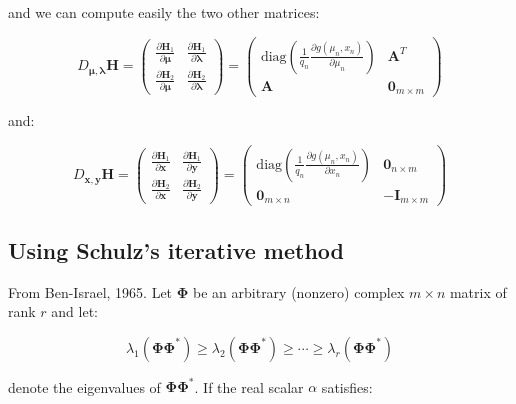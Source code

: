 \documentclass{tex/note}
\begin{document}
and we can compute easily the two other matrices:

\begin{equation*}
D_{\bm{\mu} , \bm{\lambda}} \bm{H} = \begin{pmatrix} \frac{\partial \bm{H}_1}{\partial \bm{\mu}} & \frac{\partial \bm{H}_1}{\partial \bm{\lambda}} \\ \frac{\partial \bm{H}_2}{\partial \bm{\mu}} & \frac{\partial \bm{H}_2}{\partial \bm{\lambda}}\end{pmatrix} = \begin{pmatrix} \text{diag} \left( \frac{1}{q_n} \frac{\partial g \left( \mu_n , x_n \right)}{\partial \mu_n} \right) & \bm{A}^T \\ \bm{A} & \bm{0}_{m \times m} \end{pmatrix}
\end{equation*}

and:

\begin{equation*}
D_{\bm{x} , \bm{y}} \bm{H} = \begin{pmatrix} \frac{\partial \bm{H}_1}{\partial \bm{x}} & \frac{\partial \bm{H}_1}{\partial \bm{y}} \\ \frac{\partial \bm{H}_2}{\partial \bm{x}} & \frac{\partial \bm{H}_2}{\partial \bm{y}}\end{pmatrix} = \begin{pmatrix} \text{diag} \left( \frac{1}{q_n} \frac{\partial g \left( \mu_n , x_n \right)}{\partial x_n} \right) & \bm{0}_{n \times m} \\ \bm{0}_{m \times n} & - \bm{I}_{m \times m} \end{pmatrix}
\end{equation*}

\subsection{Using Schulz's iterative method}

From Ben-Israel, 1965. Let $\bm{\Phi}$ be an arbitrary (nonzero) complex $m \times n$ matrix of rank $r$ and let:

\begin{equation*}
\lambda_1 \left( \bm{\Phi} \bm{\Phi}^* \right) \geq \lambda_2 \left( \bm{\Phi} \bm{\Phi}^* \right) \geq \cdots \geq \lambda_r \left( \bm{\Phi} \bm{\Phi}^* \right)
\end{equation*}

denote the eigenvalues of $\bm{\Phi} \bm{\Phi}^*$. If the real scalar $\alpha$ satisfies:
\end{document}
